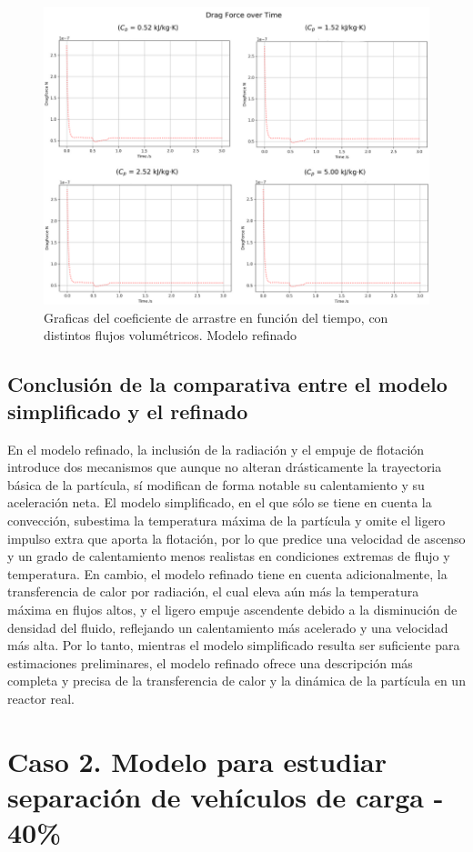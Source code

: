 \documentclass[11pt,stdletter,orderfromtodate,sigleft,twoside]{report}
\begin{document}
\begin{figure}[H]
    \centering
    \includegraphics[width=0.7\linewidth]{figures/Radcte4.png}
    \caption{Graficas del coeficiente de arrastre en función del tiempo, con distintos flujos volumétricos. Modelo refinado}
    \label{fig:enter-label}
\end{figure}

\subsection{Conclusión de la comparativa entre el modelo simplificado y el refinado}

En el modelo refinado, la inclusión de la radiación y el empuje de flotación introduce dos mecanismos que aunque no alteran drásticamente la trayectoria básica de la partícula, sí modifican de forma notable su calentamiento y su aceleración neta. El modelo simplificado, en el que sólo se tiene en cuenta la convección, subestima la temperatura máxima de la partícula y omite el ligero impulso extra que aporta la flotación, por lo que predice una velocidad de ascenso y un grado de calentamiento menos realistas en condiciones extremas de flujo y temperatura. En cambio, el modelo refinado tiene en cuenta adicionalmente, la transferencia de calor por radiación, el cual eleva aún más la temperatura máxima en flujos altos, y el ligero empuje ascendente debido a la disminución de densidad del fluido, reflejando un calentamiento más acelerado y una velocidad más alta. Por lo tanto, mientras el modelo simplificado resulta ser suficiente para estimaciones preliminares, el modelo refinado ofrece una descripción más completa y precisa de la transferencia de calor y la dinámica de la partícula en un reactor real.


\section{Caso 2. Modelo para estudiar separación de vehículos de carga - 40\%}
\end{document}
